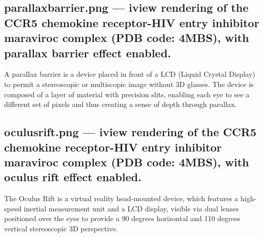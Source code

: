 \documentclass[twocolumn]{bmcart}%
\begin{document}
\begin{backmatter}
  \subsection*{parallaxbarrier.png --- iview rendering of the CCR5 chemokine receptor-HIV entry inhibitor maraviroc complex \cite{1348} (PDB code: 4MBS), with parallax barrier effect enabled.}
    A parallax barrier is a device placed in front of a LCD (Liquid Crystal Display) to permit a stereoscopic or multiscopic image without 3D glasses. The device is composed of a layer of material with precision slits, enabling each eye to see a different set of pixels and thus creating a sense of depth through parallax.

  \subsection*{oculusrift.png --- iview rendering of the CCR5 chemokine receptor-HIV entry inhibitor maraviroc complex \cite{1348} (PDB code: 4MBS), with oculus rift effect enabled.}
    The Oculus Rift is a virtual reality head-mounted device, which features a high-speed inertial measurement unit and a LCD display, visible via dual lenses positioned over the eyes to provide a 90 degrees horizontal and 110 degrees vertical stereoscopic 3D perspective.

\end{backmatter}
\end{document}
